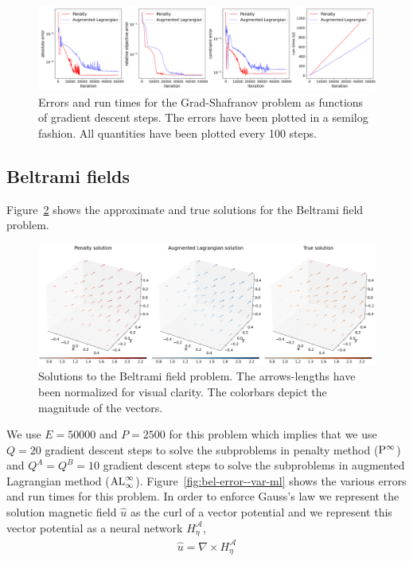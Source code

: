 \begin{figure}[!ht]
    \centering
\includegraphics[scale=0.32]{var-ml/plots/var-plots-Grad-Shafranov-error.png}
    \caption{Errors and run times for the Grad-Shafranov problem as functions of gradient descent steps. The errors have been plotted in a semilog fashion. All quantities have been plotted every 100 steps.}
    \label{fig:gs-error--var-ml}
\end{figure}
\subsection{Beltrami fields}
Figure~\ref{fig:bel--var-ml} shows the approximate and true solutions for the Beltrami field problem.
\begin{figure}[!ht]
    \centering
\includegraphics[scale=0.32]{var-ml/plots/var-plots-Beltrami-field.png}
    \caption{Solutions to the Beltrami field problem. The arrows-lengths have been normalized for visual clarity. The colorbars depict the magnitude of the vectors.}
    \label{fig:bel--var-ml}
\end{figure}
 We use $E=50000$ and $P=2500$ for this problem which implies that we use $Q=20$ gradient descent steps to solve the subproblems in penalty method (${\rm P}^\infty$) and $Q^A=Q^B=10$ gradient descent steps to solve the subproblems in augmented Lagrangian method (${\rm AL}^\infty_\infty$). Figure~\ref{fig:bel-error--var-ml} shows the various errors and run times for this problem. In order to enforce Gauss's law we represent the solution magnetic field $\hat u$ as the curl of a vector potential and we represent this vector potential as a neural network $H^{\mathcal A}_{\eta}$, 
 \begin{align}
     \hat u = \nabla\times H^{\mathcal A}_{\eta}
 \end{align}

